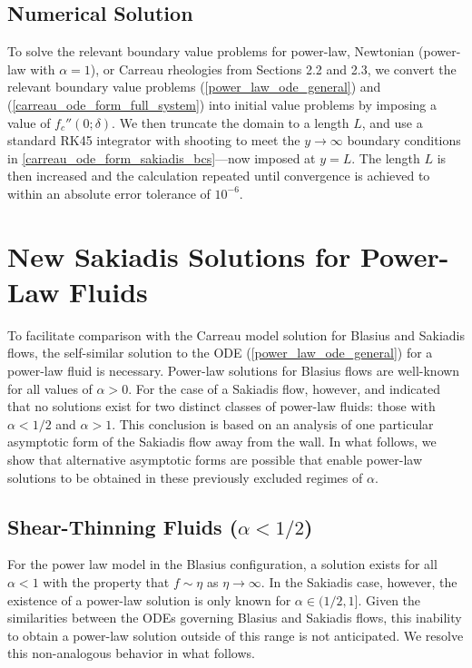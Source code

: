 \documentclass{article}
\begin{document}
\subsection{Numerical Solution}

\hspace{\parindent} To solve the relevant boundary value problems for power-law, Newtonian (power-law with $\alpha=1$), or Carreau rheologies from Sections 2.2 and 2.3, we convert the relevant boundary value problems (\ref{power_law_ode_general}) and (\ref{carreau_ode_form_full_system}) into initial value problems by imposing a value of $f_c''(0; \delta)$.  We then truncate the domain to a length $L$, and use a standard RK45 integrator with shooting to meet the $y\to\infty$ boundary conditions in \eqref{carreau_ode_form_sakiadis_bcs}---now imposed at $y=L$. The length $L$ is then increased and the calculation repeated until convergence is achieved to within an absolute error tolerance of $10^{-6}$.

\section{New Sakiadis Solutions for Power-Law Fluids}

\hspace{\parindent} To facilitate comparison with the Carreau model solution for Blasius and Sakiadis flows, the self-similar solution to the ODE (\ref{power_law_ode_general}) for a power-law fluid is necessary. Power-law solutions for Blasius flows are well-known for all values of $\alpha>0$. For the case of a Sakiadis flow, however, \cite{Fox} and \cite{NonNewtonian} indicated that no solutions exist for two distinct classes of power-law fluids: those with $\alpha < 1/2$ and $\alpha > 1$. This conclusion is based on an analysis of one particular asymptotic form of the Sakiadis flow away from the wall. In what follows, we show that alternative asymptotic forms are possible that enable power-law solutions to be obtained in these previously excluded regimes of $\alpha$.

\subsection{Shear-Thinning Fluids ($\alpha < 1/2$)}


\hspace{\parindent} For the power law model in the Blasius configuration, a solution exists for all $\alpha < 1$ with the property that $f \sim \eta$ as $\eta \to \infty$. In the Sakiadis case, however, the existence of a power-law solution is only known for $\alpha \in (1/2, 1]$.  Given the similarities between the ODEs governing Blasius and Sakiadis flows, this inability to obtain a power-law solution outside of this range is not anticipated.  We resolve this non-analogous behavior in what follows.
\end{document}
